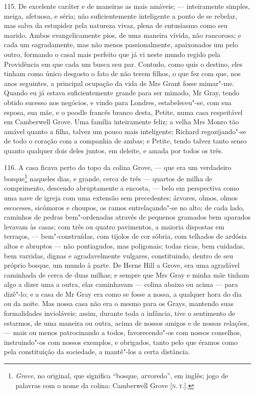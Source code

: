 115. De excelente caráter e de maneiras as mais amáveis; --- inteiramente
simples, meiga, afetuosa, e séria; não suficientemente inteligente a
ponto de se rebelar, mas salva da estupidez pela natureza vivaz, plena
de entusiasmo como seu marido. Ambos evangelicamente pios, de uma
maneira vívida, não rancorosa; e cada um sagradamente, mas não menos
passionalmente, apaixonados um pelo outro, formando o casal mais
perfeito que já vi neste mundo regido pela Providência em que cada um
busca seu par. Contudo, como quis o destino, eles tinham como único
desgosto o fato de não terem filhos, o que fez com que, nos anos
seguintes, a principal ocupação da vida de Mrs Grant fosse
mimar"-me. Quando eu já estava suficientemente grande para ser
mimado, Mr Gray, tendo obtido sucesso nos negócios, e vindo para
Londres, estabeleceu"-se, com sua esposa, sua mãe, e o poodle francês
branco desta, Petite, numa casa respeitável em Camberwell Grove. Uma
família inteiramente feliz; a velha Mrs Monro tão amável quanto a filha,
talvez um pouco mais inteligente; Richard regozijando"-se de todo o
coração com a companhia de ambas; e Petite, tendo talvez tanto senso
quanto qualquer dois deles juntos, em deleite, e amada por todos os
três.

116. A casa ficava perto do topo da colina Grove, --- que era um
verdadeiro bosque\footnote{\emph{Grove}, no original, que significa
  ``bosque, arvoredo'', em inglês; jogo de palavras com o nome da
  colina: Camberwell Grove {[}\textsc{n.\,t.}{]}.} naqueles dias, e grande,
cerca de três --- quartos de milha de comprimento, descendo abruptamente
a encosta, --- belo em perspectiva como uma nave de igreja com uma
extensão sem precedentes; árvores, olmos, olmos escoceses, sicômoros e
choupos, os ramos entrelaçando"-se no alto; de cada lado, caminhos de
pedras bem"-ordenadas através de pequenos gramados bem aparados levavam
às casas; com três ou quatro pavimentos, a maioria dispostas em
terraços, --- bem"-construídas, com tijolos de cor sóbria, com telhados de
ardósia altos e abruptos --- não pontiagudos, mas poligonais; todas
ricas, bem cuidadas, bem varridas, dignas e agradavelmente vulgares,
constituindo, dentro de seu próprio bosque, um mundo à parte. De Herne
Hill a Grove, era uma agradável caminhada de cerca de duas milhas; e
sempre que Mrs Gray e minha mãe tinham algo a dizer uma a outra, elas
caminhavam --- colina abaixo ou acima --- para dizê"-lo; e a casa de Mr
Gray era como se fosse a nossa, a qualquer hora do dia ou da noite. Mas
nossa casa não era o mesmo para os Grays, mantendo suas formalidades
invioláveis; assim, durante toda a infância, tive o sentimento de
estarmos, de uma maneira ou outra, acima de nossos amigos e de nossas
relações, --- mais ou menos patrocinando a todos, favorecendo"-os com
nossos conselhos, instruindo"-os com nossos exemplos, e obrigados, tanto
pelo que éramos como pela constituição da sociedade, a mantê"-los a certa
distância.

